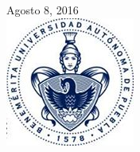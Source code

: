 \documentclass[12pt]{article}
\begin{document}
\begin{titlepage}
{\large Agosto 8, 2016}\\[1cm]


\includegraphics{buap.jpg} %
 

\end{titlepage}
\end{document}
